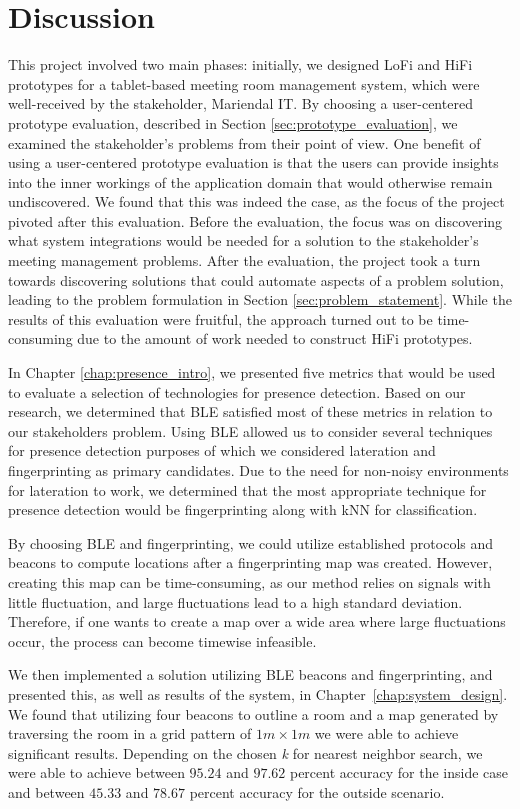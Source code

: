 \chapter{Discussion}\label{chap:discussion}
This project involved two main phases: initially, we designed LoFi and HiFi prototypes for a tablet-based meeting room management system, which were well-received by the stakeholder, Mariendal IT.
By choosing a user-centered prototype evaluation, described in Section \ref{sec:prototype_evaluation}, we examined the stakeholder's problems from their point of view.
One benefit of using a user-centered prototype evaluation is that the users can provide insights into the inner workings of the application domain that would otherwise remain undiscovered.
We found that this was indeed the case, as the focus of the project pivoted after this evaluation. 
Before the evaluation, the focus was on discovering what system integrations would be needed for a solution to the stakeholder's meeting management problems.
After the evaluation, the project took a turn towards discovering solutions that could automate aspects of a problem solution, leading to the problem formulation in Section \ref{sec:problem_statement}.
While the results of this evaluation were fruitful, the approach turned out to be time-consuming due to the amount of work needed to construct HiFi prototypes.

In Chapter \ref{chap:presence_intro}, we presented five metrics that would be used to evaluate a selection of technologies for presence detection.
Based on our research, we determined that BLE satisfied most of these metrics in relation to our stakeholders problem.
Using BLE allowed us to consider several techniques for presence detection purposes of which we considered lateration and fingerprinting as primary candidates.
Due to the need for non-noisy environments for lateration to work, we determined that the most appropriate technique for presence detection would be fingerprinting along with kNN for classification.

By choosing BLE and fingerprinting, we could utilize established protocols and beacons to compute locations after a fingerprinting map was created. 
However, creating this map can be time-consuming, as our method relies on signals with little fluctuation, and large fluctuations lead to a high standard deviation. 
Therefore, if one wants to create a map over a wide area where large fluctuations occur, the process can become timewise infeasible.

We then implemented a solution utilizing BLE beacons and fingerprinting, and presented this, as well as results of the system, in Chapter~\ref{chap:system_design}.
We found that utilizing four beacons to outline a room and a map generated by traversing the room in a grid pattern of $1m \times 1m$ we were able to achieve significant results.
Depending on the chosen \textit{k} for nearest neighbor search, we were able to achieve between $95.24$ and $97.62$ percent accuracy for the inside case and between $45.33$ and $78.67$ percent accuracy for the outside scenario. 

